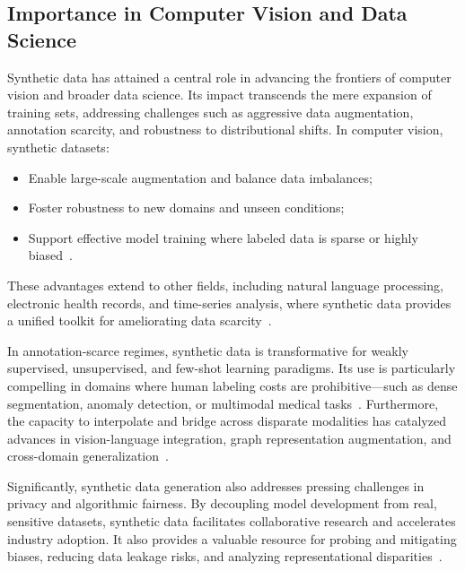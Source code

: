 \documentclass[sigconf]{acmart}
\begin{document}
\subsection{Importance in Computer Vision and Data Science}

Synthetic data has attained a central role in advancing the frontiers of computer vision and broader data science. Its impact transcends the mere expansion of training sets, addressing challenges such as aggressive data augmentation, annotation scarcity, and robustness to distributional shifts. In computer vision, synthetic datasets:
\begin{itemize}
    \item Enable large-scale augmentation and balance data imbalances;
    \item Foster robustness to new domains and unseen conditions;
    \item Support effective model training where labeled data is sparse or highly biased~\cite{ref5,ref6,ref10,ref13,ref14,ref15,ref16,ref17,ref18,ref19,ref21,ref22,ref24,ref25,ref26,ref27,ref28,ref30,ref31,ref32,ref34,ref41,ref43,ref45,ref51,ref52,ref53,ref54,ref55,ref59,ref61,ref62,ref63,ref64,ref65,ref74,ref75,ref81,ref82,ref89,ref90}.
\end{itemize}
These advantages extend to other fields, including natural language processing, electronic health records, and time-series analysis, where synthetic data provides a unified toolkit for ameliorating data scarcity~\cite{ref13,ref62,ref63,ref64,ref81}.

In annotation-scarce regimes, synthetic data is transformative for weakly supervised, unsupervised, and few-shot learning paradigms. Its use is particularly compelling in domains where human labeling costs are prohibitive—such as dense segmentation, anomaly detection, or multimodal medical tasks~\cite{ref12,ref23,ref24,ref26,ref31,ref32,ref51,ref53,ref54,ref55,ref59,ref74,ref81}. Furthermore, the capacity to interpolate and bridge across disparate modalities has catalyzed advances in vision-language integration, graph representation augmentation, and cross-domain generalization~\cite{ref14,ref18,ref64,ref81,ref89,ref90}.

Significantly, synthetic data generation also addresses pressing challenges in privacy and algorithmic fairness. By decoupling model development from real, sensitive datasets, synthetic data facilitates collaborative research and accelerates industry adoption. It also provides a valuable resource for probing and mitigating biases, reducing data leakage risks, and analyzing representational disparities~\cite{ref43,ref51,ref52,ref62,ref87,ref88}.
\end{document}
